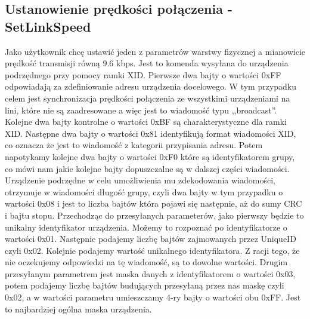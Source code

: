 		\subsection{Ustanowienie prędkości połączenia - SetLinkSpeed}
			Jako użytkownik chcę ustawić jeden z parametrów warstwy fizycznej a mianowicie prędkość transmisji równą 9.6 kbps.
			\newline\newline
			Jest to komenda wysyłana do urządzenia podrzędnego przy pomocy ramki XID.
			\newline
			Pierwsze dwa bajty o wartości 0xFF odpowiadają za zdefiniowanie adresu urządzenia docelowego. 
			W tym przypadku celem jest synchronizacja prędkości połączenia ze wszystkimi urządzeniami na lini, które nie są zaadresowane a więc jest to wiadomość typu ,,broadcast''.
			\newline
			Kolejne dwa bajty kontrolne o wartości 0xBF są charakterystyczne dla ramki XID.
			\newline
			Następne dwa bajty o wartości 0x81 identyfikują format wiadomości XID, co oznacza że jest to wiadomość z kategorii przypisania adresu.
			\newline
			Potem napotykamy kolejne dwa bajty o wartości 0xF0 które są identyfikatorem grupy, co mówi nam jakie kolejne bajty dopuszczalne są w dalszej części wiadomości.
			\newline
			Urządzenie podrzędne w celu umożliwienia mu zdekodowania wiadomości, otrzymuje w wiadomości długość grupy, czyli dwa bajty w tym przypadku o wartości 0x08 i jest to 
			liczba bajtów która pojawi się następnie, aż do sumy CRC i bajtu stopu.
			\newline
			Przechodząc do przesyłanych parameterów, jako pierwszy będzie to unikalny identyfikator urządzenia. Możemy to rozpoznać po identyfikatorze o wartości 0x01.
			Następnie podajemy liczbę bajtów zajmowanych przez UniqueID czyli 0x02. Kolejnie podajemy wartość unikalnego identyfikatora. Z racji tego, że nie oczekujemy odpowiedzi
			na tę wiadomość, są to dowolne wartości.
			Drugim przesyłanym parametrem jest maska danych z identyfikatorem o wartości 0x03, potem podajemy liczbę bajtów budujących przesyłaną przez nas maskę czyli 0x02, a w wartości 
			parametru umieszczamy 4-ry bajty o wartości obu 0xFF. Jest to najbardziej ogólna maska urządzenia.
